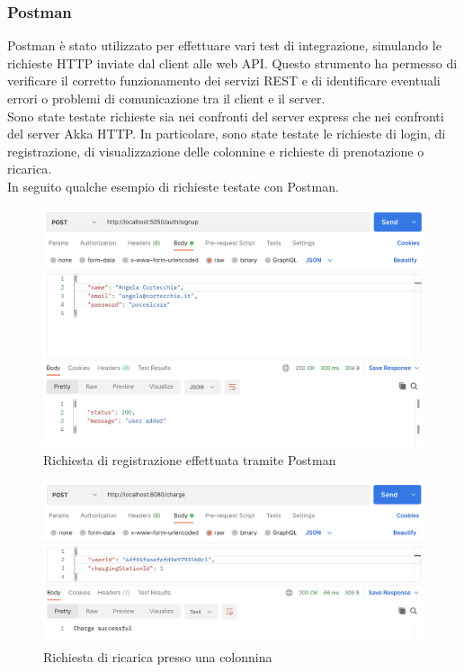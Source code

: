 \subsubsection{Postman}
Postman è stato utilizzato per effettuare vari test di integrazione, simulando le richieste
HTTP inviate dal client alle web API. Questo strumento ha permesso di verificare il corretto
funzionamento dei servizi REST e di identificare eventuali errori o problemi di comunicazione
tra il client e il server.\\

Sono state testate richieste sia nei confronti del server express che nei confronti del server
Akka HTTP. In particolare, sono state testate le richieste di login, di registrazione,
di visualizzazione delle colonnine e richieste di prenotazione o ricarica.\\

In seguito qualche esempio di richieste testate con Postman.

\begin{figure}[htbp]
    \centering
    \includegraphics[width=\textwidth]{images/signupPostman.png}
    \caption{Richiesta di registrazione effettuata tramite Postman}
    \label{fig:signupPostman}
\end{figure}

\begin{figure}[htbp]
    \centering
    \includegraphics[width=\textwidth]{images/askCharge.png}
    \caption{Richiesta di ricarica presso una colonnina}
    \label{fig:askCharge}
\end{figure}

